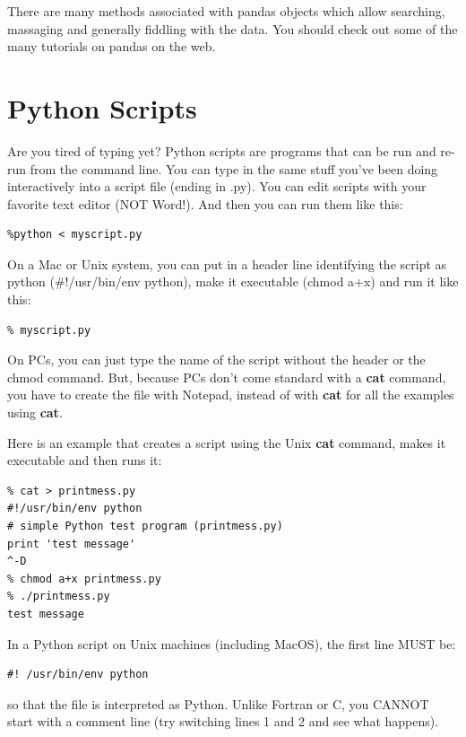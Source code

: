 \documentclass[11pt]{book}
\begin{document}
{{There are many methods associated with pandas objects which allow searching, massaging and generally fiddling with the data.   You should check out some of the many tutorials on pandas on the web.

\section{Python Scripts}

Are you tired of typing yet? Python scripts are programs that can be run and re-run from the command line.
You can type in the same stuff you've been doing interactively into a script file (ending in .py). You can edit scripts with your favorite text editor (NOT Word!).   And then you can run them like this:

{ \color{blue} \begin{verbatim}
%python < myscript.py
\end{verbatim}}

On a Mac or Unix system,  you can put in a header line identifying the script as python (\#!/usr/bin/env python), make  it executable (chmod a+x)  and   run it like this:

{ \color{blue} \begin{verbatim}
% myscript.py
\end{verbatim}}

On PCs, you can just type the name of the script without the header or the chmod command.   But, because PCs don't come standard with a {\bf cat} command, you have to create the file with Notepad, instead of with {\bf cat} for all the examples using {\bf cat}.

Here is an example that creates a script using the Unix {\bf cat} command, makes it executable and then runs it:

{ \color{blue} \begin{verbatim}
% cat > printmess.py
#!/usr/bin/env python
# simple Python test program (printmess.py)
print 'test message'
^-D
% chmod a+x printmess.py
% ./printmess.py
test message
\end{verbatim}}

\noindent
In a Python script on Unix machines (including MacOS), the  first line MUST be:

{ \color{blue} \begin{verbatim}
#! /usr/bin/env python
\end{verbatim}}

\noindent
so that the file is interpreted as Python.  Unlike Fortran or C, you CANNOT start with a
comment line (try switching lines 1 and 2 and see what happens).

}}
\end{document}
